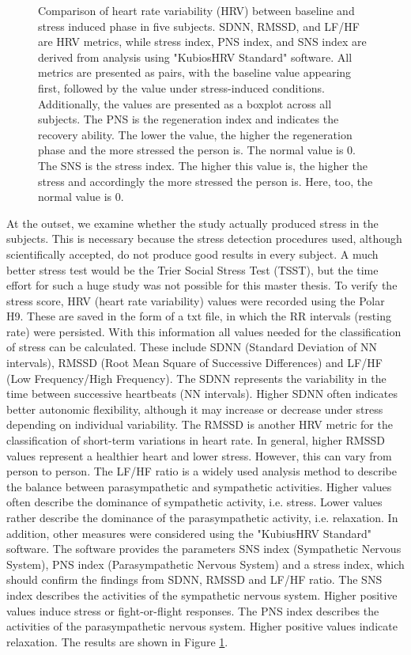 \begin{figure}[!t]
    \caption{Comparison of heart rate variability (HRV) between baseline and stress induced phase in five subjects. SDNN, RMSSD, and LF/HF are HRV metrics, while stress index, PNS index, and SNS index are derived from analysis using "KubiosHRV Standard" software. All metrics are presented as pairs, with the baseline value appearing first, followed by the value under stress-induced conditions. Additionally, the values are presented as a boxplot across all subjects. The PNS is the regeneration index and indicates the recovery ability. The lower the value, the higher the regeneration phase and the more stressed the person is. The normal value is 0. The SNS is the stress index. The higher this value is, the higher the stress and accordingly the more stressed the person is. Here, too, the normal value is 0.}
    \label{subsec:Evaluation:Study2:ground_truth_result}
\end{figure}


At the outset, we examine whether the study actually produced stress in the subjects. 
This is necessary because the stress detection procedures used, although scientifically accepted, do not produce good results in every subject. 
A much better stress test would be the Trier Social Stress Test (TSST), but the time effort for such a huge study was not possible for this master thesis. 
To verify the stress score, HRV (heart rate variability) values were recorded using the Polar H9.
These are saved in the form of a txt file, in which the RR intervals (resting rate) were persisted.
With this information all values needed for the classification of stress can be calculated.
These include SDNN (Standard Deviation of NN intervals), RMSSD (Root Mean Square of Successive Differences) and LF/HF (Low Frequency/High Frequency).
The SDNN represents the variability in the time between successive heartbeats (NN intervals). 
Higher SDNN often indicates better autonomic flexibility, although it may increase or decrease under stress depending on individual variability.
The RMSSD is another HRV metric for the classification of short-term variations in heart rate.
In general, higher RMSSD values represent a healthier heart and lower stress.
However, this can vary from person to person.
The LF/HF ratio is a widely used analysis method to describe the balance between parasympathetic and sympathetic activities. 
Higher values often describe the dominance of sympathetic activity, i.e. stress. 
Lower values rather describe the dominance of the parasympathetic activity, i.e. relaxation.
In addition, other measures were considered using the "KubiusHRV Standard" software.
The software provides the parameters SNS index (Sympathetic Nervous System), PNS index (Parasympathetic Nervous System) and a stress index, which should confirm the findings from SDNN, RMSSD and LF/HF ratio.
The SNS index describes the activities of the sympathetic nervous system. 
Higher positive values induce stress or fight-or-flight responses.
The PNS index describes the activities of the parasympathetic nervous system. 
Higher positive values indicate relaxation.
The results are shown in Figure \ref{subsec:Evaluation:Study2:ground_truth_result}. 

